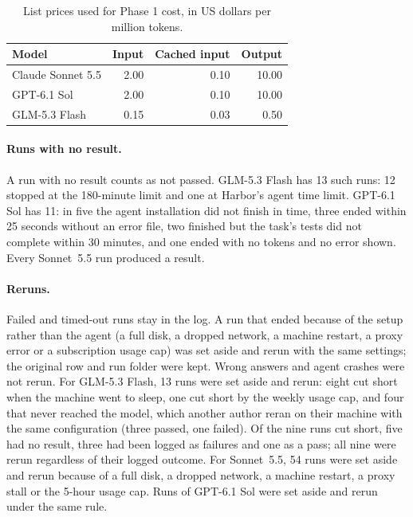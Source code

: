 \begin{table}[!h]
\centering\small
\caption{List prices used for Phase 1 cost, in US dollars per million tokens.}
\label{tab:p1prices}
\begin{tabular}{lrrr}
\toprule
Model & Input & Cached input & Output\\
\midrule
Claude Sonnet 5.5 & 2.00 & 0.10 & 10.00\\
GPT-6.1 Sol & 2.00 & 0.10 & 10.00\\
GLM-5.3 Flash & 0.15 & 0.03 & 0.50\\
\bottomrule
\end{tabular}
\end{table}

\paragraph{Runs with no result.}
A run with no result counts as not passed. GLM-5.3 Flash has 13 such runs: 12 stopped at the 180-minute limit and
one at Harbor's agent time limit. GPT-6.1 Sol has 11: in five the agent installation did not finish in time, three
ended within 25 seconds without an error file, two finished but the task's tests did not complete within 30
minutes, and one ended with no tokens and no error shown. Every Sonnet~5.5 run produced a result.

\paragraph{Reruns.}
Failed and timed-out runs stay in the log. A run that ended because of the setup rather than the agent (a full
disk, a dropped network, a machine restart, a proxy error or a subscription usage cap) was set aside and rerun with
the same settings; the original row and run folder were kept. Wrong answers and agent crashes were not rerun.
For GLM-5.3 Flash, 13 runs were set aside and rerun: eight cut short when the machine went to sleep, one cut short
by the weekly usage cap, and four that never reached the model, which another author reran on their machine with
the same configuration (three passed, one failed). Of the nine runs cut short, five had no result, three had been
logged as failures and one as a pass; all nine were rerun regardless of their logged outcome.
For Sonnet~5.5, 54 runs were set aside and rerun because of a full disk, a dropped network, a machine restart, a
proxy stall or the 5-hour usage cap.
Runs of GPT-6.1 Sol were set aside and rerun under the same rule.

